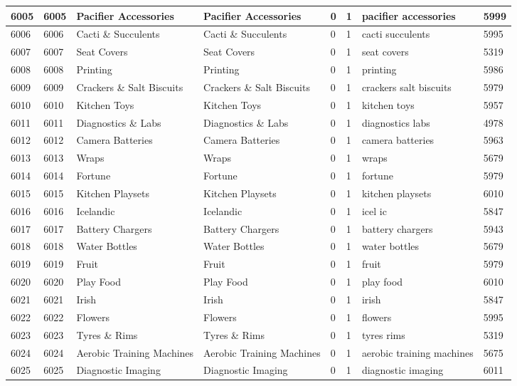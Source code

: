 \begin{longtable}{|l|l|l|l|l|l|l|l|}
6005 & 6005 & Pacifier Accessories & Pacifier Accessories & 0 & 1 & pacifier accessories & 5999 \\ \hline 
6006 & 6006 & Cacti \& Succulents & Cacti \& Succulents & 0 & 1 & cacti succulents & 5995 \\ \hline 
6007 & 6007 & Seat Covers & Seat Covers & 0 & 1 & seat covers & 5319 \\ \hline 
6008 & 6008 & Printing & Printing & 0 & 1 & printing & 5986 \\ \hline 
6009 & 6009 & Crackers \& Salt Biscuits & Crackers \& Salt Biscuits & 0 & 1 & crackers salt biscuits & 5979 \\ \hline 
6010 & 6010 & Kitchen Toys & Kitchen Toys & 0 & 1 & kitchen toys & 5957 \\ \hline 
6011 & 6011 & Diagnostics \& Labs & Diagnostics \& Labs & 0 & 1 & diagnostics labs & 4978 \\ \hline 
6012 & 6012 & Camera Batteries & Camera Batteries & 0 & 1 & camera batteries & 5963 \\ \hline 
6013 & 6013 & Wraps & Wraps & 0 & 1 & wraps & 5679 \\ \hline 
6014 & 6014 & Fortune & Fortune & 0 & 1 & fortune & 5979 \\ \hline 
6015 & 6015 & Kitchen Playsets & Kitchen Playsets & 0 & 1 & kitchen playsets & 6010 \\ \hline 
6016 & 6016 & Icelandic & Icelandic & 0 & 1 & icel ic & 5847 \\ \hline 
6017 & 6017 & Battery Chargers & Battery Chargers & 0 & 1 & battery chargers & 5943 \\ \hline 
6018 & 6018 & Water Bottles & Water Bottles & 0 & 1 & water bottles & 5679 \\ \hline 
6019 & 6019 & Fruit & Fruit & 0 & 1 & fruit & 5979 \\ \hline 
6020 & 6020 & Play Food & Play Food & 0 & 1 & play food & 6010 \\ \hline 
6021 & 6021 & Irish & Irish & 0 & 1 & irish & 5847 \\ \hline 
6022 & 6022 & Flowers & Flowers & 0 & 1 & flowers & 5995 \\ \hline 
6023 & 6023 & Tyres \& Rims & Tyres \& Rims & 0 & 1 & tyres rims & 5319 \\ \hline 
6024 & 6024 & Aerobic Training Machines & Aerobic Training Machines & 0 & 1 & aerobic training machines & 5675 \\ \hline 
6025 & 6025 & Diagnostic Imaging & Diagnostic Imaging & 0 & 1 & diagnostic imaging & 6011 \\ \hline 

\end{longtable}

